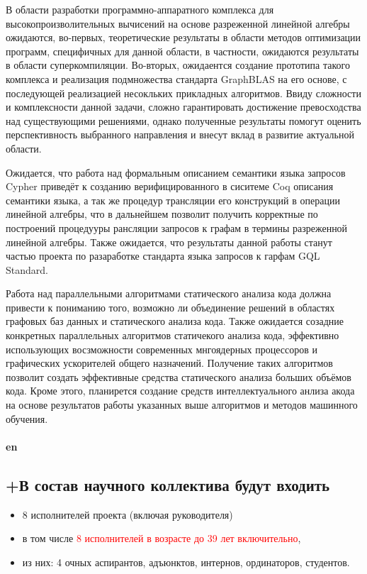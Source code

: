 \documentclass[12pt]{article}  %
\theoremstyle{remark}
\newcommand{\checkme}[1]{\textcolor{red}{#1}}
\begin{document}
В области разработки программно-аппаратного комплекса для высокопроизволительных вычисений на основе разреженной линейной алгебры ожидаются, во-первых, теоретические результаты в области методов оптимизации программ, специфичных для данной области, в частности, ожидаются результаты в области суперкомпиляции. Во-вторых, ожидаентся создание прототипа такого комплекса и реализация подмножества стандарта GraphBLAS на его основе, с последующей реализацией несокльких прикладных алгоритмов. Ввиду сложности и комплексности данной задачи, сложно гарантировать достижение превосходства над существующими решениями, однако полученные результаты помогут оценить перспективность выбранного направления и внесут вклад в развитие актуальной области. 

Ожидается, что работа над формальным описанием семантики языка запросов Cypher приведёт к созданию верифицированного в сиситеме Coq описания семантики языка, а так же процедур трансляции его конструкций в операции линейной алгебры, что в дальнейшем позволит получить корректные по построений процедууры рансляции запросов к графам в термины разреженной линейной алгебры. Также ожидается, что результаты данной работы станут частью проекта по разаработке стандарта языка запросов к гарфам GQL Standard. 

Работа над параллельными алгоритмами статического анализа кода должна привести к пониманию того, возможно ли объединение решений в областях графовых баз данных и статического анализа кода. Также ожидается созадние конкретных параллельных алгоритмов статичекого анализа кода, эффективно использующих восзможности современных мнгоядерных процессоров и графических ускорителей общего назначений. Получение таких алгоритмов позволит создать эффективные средства статического анализа больших объёмов кода. Кроме этого, планирется создание средств интеллектуального анлиза акода на основе результатов работы указанных выше алгоритмов и методов машинного обучения.  
\\
\\
\textbf{en}\\


\subsection{+В состав научного коллектива будут входить}
%
\begin{itemize}
\item 8 исполнителей проекта (включая руководителя)
\item в том числе \checkme{8  исполнителей в возрасте до 39 лет включительно},
\item из них: 4 очных аспирантов, адъюнктов, интернов, ординаторов, студентов.
\end{itemize}
\end{document}
